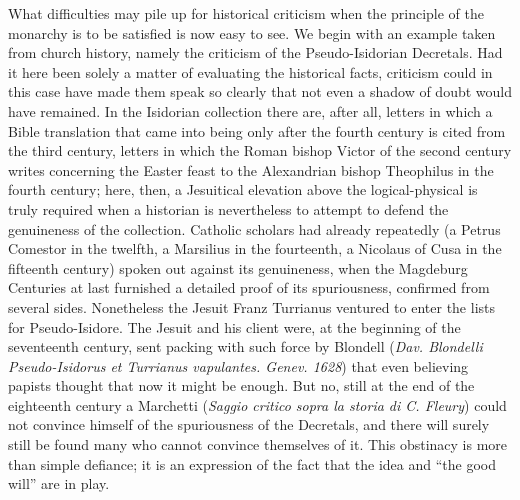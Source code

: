 \documentclass[12pt]{book}
\newcommand{\opage}[1]{\marginnote{\footnotesize\textit{[#1]}}}
\begin{document}
What difficulties may pile up for historical criticism when the principle of the monarchy is to be satisfied is now easy to see. We begin with an example taken from church history, namely the criticism of the Pseudo-Isidorian Decretals. Had it here been solely a matter of evaluating the historical facts, criticism could in this case have made them
\opage{43}\setcounter{footnote}{0}%
speak so clearly that not even a shadow of doubt would have remained. In the Isidorian collection there are, after all, letters in which a Bible translation that came into being only after the fourth century is cited from the third century, letters in which the Roman bishop Victor of the second century writes concerning the Easter feast to the Alexandrian bishop Theophilus in the fourth century; here, then, a Jesuitical elevation above the logical-physical is truly required when a historian is nevertheless to attempt to defend the genuineness of the collection. Catholic scholars had already repeatedly (a Petrus Comestor in the twelfth, a Marsilius in the fourteenth, a Nicolaus of Cusa in the fifteenth century) spoken out against its genuineness, when the Magdeburg Centuries at last furnished a detailed proof of its spuriousness, confirmed from several sides. Nonetheless the Jesuit Franz Turrianus ventured to enter the lists for Pseudo-Isidore. The Jesuit and his client were, at the beginning of the seventeenth century, sent packing with such
force by Blondell (\textit{Dav. Blondelli Pseudo-Isidorus et Turrianus vapulantes. Genev. 1628}) that even believing papists thought that now it might be enough. But no, still at the end of the eighteenth century a Marchetti (\textit{Saggio critico sopra la storia di C. Fleury}) could not convince himself of the spuriousness of the Decretals, and there will surely still be found many who cannot convince themselves of it. This obstinacy is more than simple defiance; it is an expression of the fact that the idea and ``the good will'' are in play.
\end{document}
